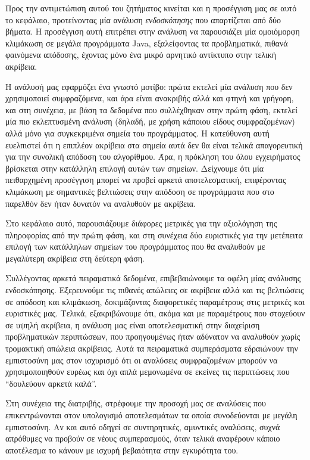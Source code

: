 Προς την αντιμετώπιση αυτού του ζητήματος κινείται και η προσέγγιση μας σε αυτό το κεφάλαιο, προτείνοντας μία ανάλυση \emph{ενδοσκόπησης} που απαρτίζεται από δύο βήματα. Η προσέγγιση αυτή επιτρέπει στην ανάλυση να παρουσιάζει μία ομοιόμορφη κλιμάκωση σε μεγάλα προγράμματα {\en Java}, εξαλείφοντας τα προβληματικά, πιθανά φαινόμενα απόδοσης, έχοντας μόνο ένα μικρό αρνητικό αντίκτυπο στην τελική ακρίβεια.

Η ανάλυσή μας εφαρμόζει ένα γνωστό μοτίβο: πρώτα εκτελεί μία ανάλυση που δεν χρησιμοποιεί συμφραζόμενα, και άρα είναι ανακριβής αλλά και φτηνή και γρήγορη, και στη συνέχεια, με βάση τα δεδομένα που συλλέχθηκαν στην πρώτη φάση, εκτελεί μία πιο εκλεπτυσμένη ανάλυση (δηλαδή, με χρήση κάποιου είδους συμφραζομένων) αλλά μόνο για συγκεκριμένα σημεία του προγράμματος. Η κατεύθυνση αυτή ευελπιστεί ότι η επιπλέον ακρίβεια στα σημεία αυτά δεν θα είναι τελικά απαγορευτική για την συνολική απόδοση του αλγορίθμου. Άρα, η πρόκληση του όλου εγχειρήματος βρίσκεται στην κατάλληλη επιλογή αυτών των σημείων. Δείχνουμε ότι μία πειθαρχημένη προσέγγιση μπορεί να προβεί αρκετά αποτελεσματική, επιφέροντας κλιμάκωση με σημαντικές βελτιώσεις στην απόδοση σε προγράμματα που στο παρελθόν δεν ήταν δυνατόν να αναλυθούν με ακρίβεια.

Στο κεφάλαιο αυτό, παρουσιάζουμε διάφορες μετρικές για την αξιολόγηση της πληροφορίας από την πρώτη φάση, και στη συνέχεια δύο ευριστικές για την μετέπειτα επιλογή των κατάλληλων σημείων του προγράμματος που θα αναλυθούν με μεγαλύτερη ακρίβεια στη δεύτερη φάση.

Συλλέγοντας αρκετά πειραματικά δεδομένα, επιβεβαιώνουμε τα οφέλη μίας ανάλυσης ενδοσκόπησης. Εξερευνούμε τις πιθανές απώλειες σε ακρίβεια αλλά και τις βελτιώσεις σε απόδοση και κλιμάκωση, δοκιμάζοντας διαφορετικές παραμέτρους στις μετρικές και ευριστικές μας. \mbox{Τελικά}, εξακριβώνουμε ότι, ακόμα και με παραμέτρους που στοχεύουν σε υψηλή ακρίβεια, η ανάλυση μας είναι αποτελεσματική στην διαχείριση προβληματικών περιπτώσεων, που προηγουμένως ήταν αδύνατον να αναλυθούν χωρίς τρομακτική απώλεια ακρίβειας. Αυτά τα πειραματικά συμπεράσματα εδραιώνουν την εμπιστοσύνη μας στον ισχυρισμό ότι οι αναλύσεις συμφραζομένων μπορούν να χρησιμοποιηθούν ευρέως και όχι απλά μεμονωμένα σε εκείνες τις περιπτώσεις που ``δουλεύουν αρκετά καλά''.


\vspace{5 mm}
Στη συνέχεια της διατριβής, στρέφουμε την προσοχή μας σε αναλύσεις που επικεντρώνονται στον υπολογισμό αποτελεσμάτων τα οποία συνοδεύονται με μεγάλη εμπιστοσύνη. Αν και αυτό οδηγεί σε συντηρητικές, αμυντικές αναλύσεις, συχνά απρόθυμες να προβούν σε νέους συμπερασμούς, όταν τελικά αναφέρουν κάποιο αποτέλεσμα το κάνουν με ισχυρή βεβαιότητα στην εγκυρότητα του.


